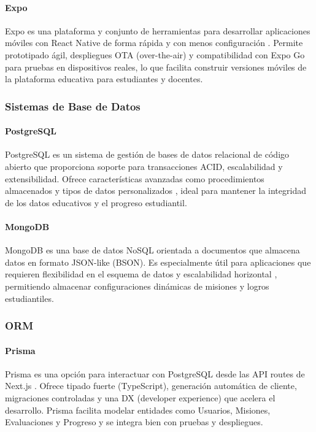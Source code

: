 \paragraph{Expo}
Expo es una plataforma y conjunto de herramientas para desarrollar aplicaciones móviles con React Native de forma rápida y con menos configuración \cite{expo_docs2023}. Permite prototipado ágil, despliegues OTA (over-the-air) y compatibilidad con Expo Go para pruebas en dispositivos reales, lo que facilita construir versiones móviles de la plataforma educativa para estudiantes y docentes.

\subsubsection{Sistemas de Base de Datos}

\paragraph{PostgreSQL}
PostgreSQL es un sistema de gestión de bases de datos relacional de código abierto que proporciona soporte para transacciones ACID, escalabilidad y extensibilidad. Ofrece características avanzadas como procedimientos almacenados y tipos de datos personalizados \cite{postgresql2024}, ideal para mantener la integridad de los datos educativos y el progreso estudiantil.

\paragraph{MongoDB}
MongoDB es una base de datos NoSQL orientada a documentos que almacena datos en formato JSON-like (BSON). Es especialmente útil para aplicaciones que requieren flexibilidad en el esquema de datos y escalabilidad horizontal \cite{mongodb2023}, permitiendo almacenar configuraciones dinámicas de misiones y logros estudiantiles.

\subsubsection{ORM}
\paragraph{Prisma}
Prisma es una opción  para interactuar con PostgreSQL desde las API routes de Next.js \cite{prisma_docs2024}. Ofrece tipado fuerte (TypeScript), generación automática de cliente, migraciones controladas y una DX (developer experience) que acelera el desarrollo. Prisma facilita modelar entidades como Usuarios, Misiones, Evaluaciones y Progreso y se integra bien con pruebas y despliegues.

